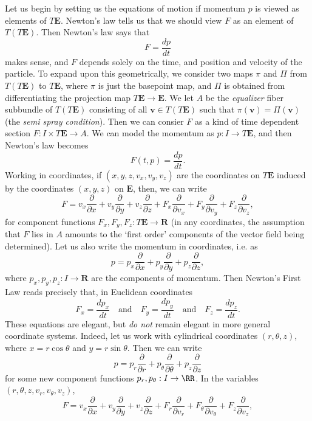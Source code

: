 Let us begin by setting us the equations of motion if momentum $p$ is viewed as elements of $T \mathbf{E}$. Newton's law tells us that we should view $F$ as an element of $T(T \mathbf{E})$. Then Newton's law says that
%
\[ F = \frac{dp}{dt} \]
%
makes sense, and $F$ depends solely on the time, and position and velocity of the particle. To expand upon this geometrically, we consider two maps $\pi$ and $\Pi$ from $T(T \mathbf{E})$ to $T \mathbf{E}$, where $\pi$ is just the basepoint map, and $\Pi$ is obtained from differentiating the projection map $T \mathbf{E} \to \mathbf{E}$. We let $A$ be the \emph{equalizer} fiber subbundle of $T(T\mathbf{E})$ consisting of all $\mathbf{v} \in T(T\mathbf{E})$ such that $\pi(\mathbf{v}) = \Pi(\mathbf{v})$ (the \emph{semi spray condition}). Then we can consier $F$ as a kind of time dependent section $F: I \times T \mathbf{E} \to A$. We can model the momentum as $p: I \to T \mathbf{E}$, and then Newton's law becomes
%
\[ F(t,p) = \frac{dp}{dt}. \]
%
Working in coordinates, if $(x,y,z,v_x,v_y,v_z)$ are the coordinates on $T\mathbf{E}$ induced by the coordinates $(x,y,z)$ on $\mathbf{E}$, then, we can write
%
\[ F = v_x \frac{\partial}{\partial x} + v_y \frac{\partial}{\partial y} + v_z \frac{\partial}{\partial z} + F_x \frac{\partial}{\partial v_x} + F_y \frac{\partial}{\partial v_y} + F_z \frac{\partial}{\partial v_z}, \]
%
for component functions $F_x,F_y,F_z: T \mathbf{E} \to \mathbf{R}$ (in any coordinates, the assumption that $F$ lies in $A$ amounts to the `first order' components of the vector field being determined). Let us also write the momentum in coordinates, i.e. as
%
\[ p = p_x \frac{\partial}{\partial x} + p_y \frac{\partial}{\partial y} + p_z \frac{\partial}{\partial z}, \]
%
where $p_x,p_y,p_z: I \to \mathbf{R}$ are the components of momentum. Then Newton's First Law reads precisely that, in Euclidean coordinates
%
\[ F_x = \frac{d p_x}{dt} \quad\text{and}\quad F_y = \frac{d p_y}{d t} \quad\text{and}\quad F_z = \frac{d p_z}{dt}. \]
%
These equations are elegant, but \emph{do not} remain elegant in more general coordinate systems. Indeed, let us work with cylindrical coordinates $(r,\theta,z)$, where $x = r \cos \theta$ and $y = r \sin \theta$. Then we can write
%
\[ p = p_r \frac{\partial}{\partial r} + p_\theta \frac{\partial}{\partial \theta} + p_z \frac{\partial}{\partial z} \]
%
for some new component functions $p_r, p_\theta: I \to \RR$. In the variables $(r,\theta,z, v_r, v_\theta, v_z)$,
%
\[ F = v_x \frac{\partial}{\partial x} + v_y \frac{\partial}{\partial y} + v_z \frac{\partial}{\partial z} + F_r \frac{\partial}{\partial v_r} + F_\theta \frac{\partial}{\partial v_\theta} + F_z \frac{\partial}{\partial v_z}, \]
